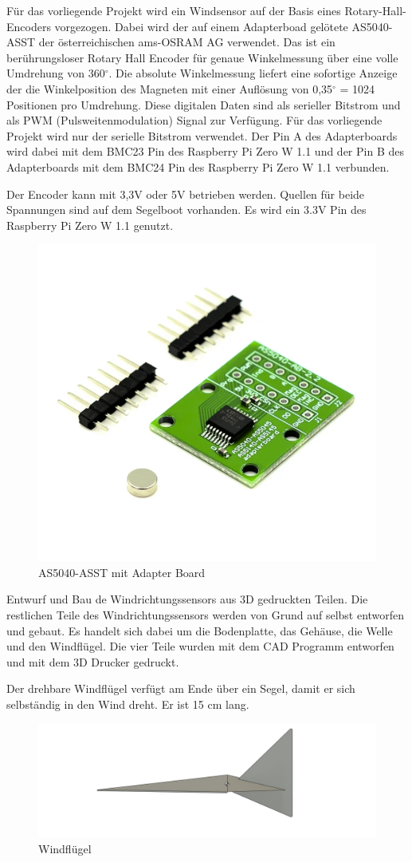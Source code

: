 Für das vorliegende Projekt wird ein Windsensor auf der Basis eines Rotary-Hall-Encoders vorgezogen. Dabei wird der auf einem Adapterboad gelötete AS5040-ASST der österreichischen ams-OSRAM AG verwendet. Das ist ein berührungsloser Rotary Hall Encoder für genaue Winkelmessung über eine volle Umdrehung von 360$^\circ$.  Die absolute Winkelmessung liefert eine sofortige Anzeige der die Winkelposition des Magneten mit einer Auflösung von 0,35$^\circ$ = 1024 Positionen pro Umdrehung. Diese digitalen Daten sind als serieller Bitstrom und als PWM (Pulsweitenmodulation) Signal zur Verfügung. Für das vorliegende Projekt wird nur der serielle Bitstrom verwendet. Der Pin A des Adapterboards wird dabei mit dem BMC23 Pin des Raspberry Pi Zero W 1.1 und der Pin B des Adapterboards mit dem BMC24 Pin des Raspberry Pi Zero W 1.1 verbunden.

Der Encoder kann mit 3,3V oder 5V betrieben werden. Quellen für beide Spannungen sind auf dem Segelboot vorhanden. Es wird ein 3.3V Pin des Raspberry Pi Zero W 1.1 genutzt.

\begin{figure}
    \centering
    \includegraphics[width=0.5\linewidth]{assets/as5040image.png}
    \caption{AS5040-ASST mit Adapter Board}
    \label{fig:as5040}
\end{figure}

Entwurf und Bau de Windrichtungssensors aus 3D gedruckten Teilen. 
Die restlichen Teile des Windrichtungssensors werden von Grund auf selbst entworfen und gebaut. Es handelt sich dabei um die Bodenplatte, das Gehäuse, die Welle und den Windflügel. Die vier Teile wurden mit dem CAD Programm entworfen und mit dem 3D Drucker gedruckt.

Der drehbare Windflügel verfügt am Ende über ein Segel, damit er sich selbständig in den Wind dreht. Er ist 15 cm lang.
\begin{figure}[H]
    \centering
    \includegraphics[width=0.75\linewidth]{assets/windsensor_top.png}
    \caption{Windflügel}
    
\end{figure}

